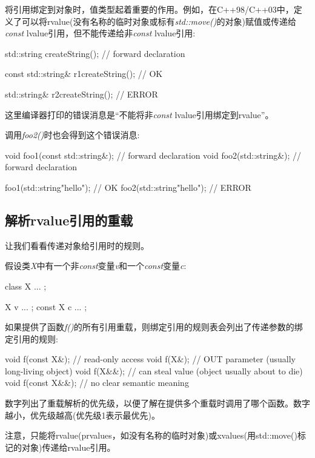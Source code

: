 将引用绑定到对象时，值类型起着重要的作用。例如，在C++98/C++03中，定义了可以将rvalue(没有名称的临时对象或标有\textit{std::move()}的对象)赋值或传递给\textit{const} lvalue引用，但不能传递给非\textit{const} lvalue引用:

\begin{cppcode}
std::string createString(); // forward declaration

const std::string& r1{createString()}; // OK

std::string& r2{createString()}; // ERROR
\end{cppcode}

这里编译器打印的错误消息是“不能将非\textit{const} lvalue引用绑定到rvalue”。

调用\textit{foo2()}时也会得到这个错误消息:

\begin{cppcode}
void foo1(const std::string&); // forward declaration
void foo2(std::string&); // forward declaration

foo1(std::string{"hello"}); // OK
foo2(std::string{"hello"}); // ERROR
\end{cppcode}

\subsection{解析rvalue引用的重载}

让我们看看传递对象给引用时的规则。

假设类\textit{X}中有一个非\textit{const}变量\textit{v}和一个\textit{const}变量\textit{c}:

\begin{cppcode}
class X {
	...
};

X v{ ... };
const X c{ ... };
\end{cppcode}

如果提供了函数\textit{f()}的所有引用重载，则绑定引用的规则表会列出了传递参数的绑定引用的规则:

\begin{cppcode}
void f(const X&); // read-only access
void f(X&); // OUT parameter (usually long-living object)
void f(X&&); // can steal value (object usually about to die)
void f(const X&&); // no clear semantic meaning
\end{cppcode}

数字列出了重载解析的优先级，以便了解在提供多个重载时调用了哪个函数。数字越小，优先级越高(优先级1表示最优先)。

注意，只能将rvalue(prvalues，如没有名称的临时对象)或xvalues(用std::move()标记的对象)传递给rvalue引用。

